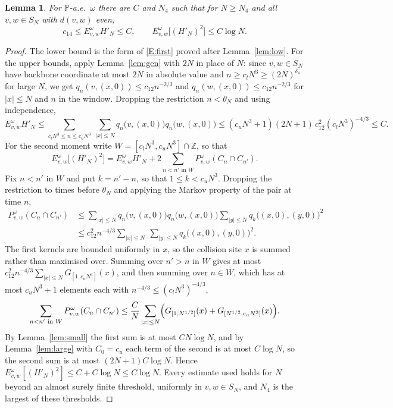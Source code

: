 \documentclass[11pt]{amsart}
\newtheorem{lemma}[theorem]{Lemma}
\theoremstyle{remark}
\numberwithin{equation}{section}
\newcommand{\PP}{\mathbb{P}}
\newcommand{\Z}{\mathbb{Z}}
\begin{document}
\begin{lemma}\label{lem:moments}
For $\PP$-a.e.\ $\omega$ there are $C$ and $N_4$ such that for $N\ge N_4$ and all $v,w\in S_N$ with $d(v,w)$ even,
\[
c_{14}\le E^\omega_{v,w}H'_N\le C,\qquad E^\omega_{v,w}\bigl[(H'_N)^2\bigr]\le C\log N .
\]
\end{lemma}

\begin{proof}
The lower bound is the form of \ref{E:first} proved after Lemma~\ref{lem:low}. For the upper bounds, apply Lemma~\ref{lem:gen} with $2N$ in place of $N$: since $v,w\in S_N$ have backbone coordinate at most $2N$ in absolute value and $n\ge c_lN^3\ge(2N)^{\delta_4}$ for large $N$, we get $q_n(v,(x,0))\le c_{12}n^{-2/3}$ and $q_n(w,(x,0))\le c_{12}n^{-2/3}$ for $|x|\le N$ and $n$ in the window. Dropping the restriction $n<\theta_N$ and using independence,
\[
E^\omega_{v,w}H'_N\le\sum_{c_lN^3\le n\le c_uN^3}\ \sum_{|x|\le N}q_n\bigl(v,(x,0)\bigr)q_n\bigl(w,(x,0)\bigr)\le(c_uN^3+1)(2N+1)\,c_{12}^2(c_lN^3)^{-4/3}\le C .
\]
For the second moment write $W=[c_lN^3,c_uN^3]\cap\Z$, so that
\[
E^\omega_{v,w}\bigl[(H'_N)^2\bigr]=E^\omega_{v,w}H'_N+2\sum_{n<n'\text{ in }W}P^\omega_{v,w}(C_n\cap C_{n'}).
\]
Fix $n<n'$ in $W$ and put $k=n'-n$, so that $1\le k<c_uN^3$. Dropping the restriction to times before $\theta_N$ and applying the Markov property of the pair at time $n$,
\[
\begin{aligned}
P^\omega_{v,w}(C_n\cap C_{n'})&\le\sum_{|x|\le N}q_n\bigl(v,(x,0)\bigr)q_n\bigl(w,(x,0)\bigr)\sum_{|y|\le N}q_k\bigl((x,0),(y,0)\bigr)^2\\
&\le c_{12}^2n^{-4/3}\sum_{|x|\le N}\ \sum_{|y|\le N}q_k\bigl((x,0),(y,0)\bigr)^2 .
\end{aligned}
\]
The first kernels are bounded uniformly in $x$, so the collision site $x$ is summed rather than maximised over. Summing over $n'>n$ in $W$ gives at most $c_{12}^2n^{-4/3}\sum_{|x|\le N}G_{[1,c_uN^3]}(x)$, and then summing over $n\in W$, which has at most $c_uN^3+1$ elements each with $n^{-4/3}\le(c_lN^3)^{-4/3}$,
\[
\sum_{n<n'\text{ in }W}P^\omega_{v,w}(C_n\cap C_{n'})\le\frac CN\sum_{|x|\le N}\Bigl(G_{[1,N^{1/2}]}(x)+G_{[N^{1/2},c_uN^3]}(x)\Bigr).
\]
By Lemma~\ref{lem:small} the first sum is at most $CN\log N$, and by Lemma~\ref{lem:large} with $C_0=c_u$ each term of the second is at most $C\log N$, so the second sum is at most $(2N+1)C\log N$. Hence $E^\omega_{v,w}[(H'_N)^2]\le C+C\log N\le C\log N$. Every estimate used holds for $N$ beyond an almost surely finite threshold, uniformly in $v,w\in S_N$, and $N_4$ is the largest of these thresholds.
\end{proof}
\end{document}
